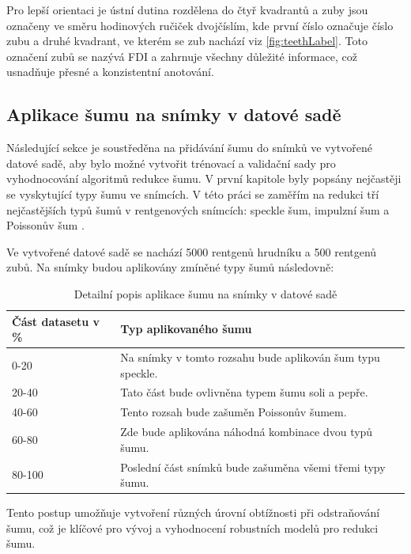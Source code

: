 \documentclass[male,czech,api_ing]{thesis}
\begin{document}
Pro lepší orientaci je ústní dutina rozdělena do čtyř kvadrantů a zuby jsou označeny ve směru hodinových ručiček dvojčíslím, kde první číslo označuje číslo zubu a druhé kvadrant, ve kterém se zub nachází viz \ref{fig:teethLabel}. Toto označení zubů se nazývá FDI \cite{FDI-teeth_labeling} a zahrnuje všechny důležité informace, což usnadňuje přesné a konzistentní anotování.

\subsection{Aplikace šumu na snímky v datové sadě}
Následující sekce je soustředěna na přidávání šumu do snímků ve vytvořené datové sadě, aby bylo možné vytvořit trénovací a validační sady pro vyhodnocování algoritmů redukce šumu. V první kapitole byly popsány nejčastěji se vyskytující typy šumu ve snímcích. V této práci se zaměřím na redukci tří nejčastějších typů šumů v rentgenových snímcích: speckle šum, impulzní šum a Poissonův šum \cite{MostCommonNoises}.

Ve vytvořené datové sadě se nachází 5000 rentgenů hrudníku a 500 rentgenů zubů. Na snímky budou aplikovány zmíněné typy šumů následovně:

\begin{table}[h]
    \centering
    \begin{tabular}{|l|l|}
        \hline
        \textbf{Část datasetu v \%} & \textbf{Typ aplikovaného šumu}                    \\ \hline
        0-20   & Na snímky v tomto rozsahu bude aplikován šum typu speckle.             \\ \hline
        20-40  & Tato část bude ovlivněna typem šumu soli a pepře.                      \\ \hline
        40-60  & Tento rozsah bude zašuměn Poissonův šumem.                             \\ \hline
        60-80  & Zde bude aplikována náhodná kombinace dvou typů šumu.                  \\ \hline
        80-100 & Poslední část snímků bude zašuměna všemi třemi typy šumu.              \\ 
        \hline
    \end{tabular}
    \caption{Detailní popis aplikace šumu na snímky v datové sadě}
    \label{table:noiseTypes}
\end{table}

Tento postup umožňuje vytvoření různých úrovní obtížnosti při odstraňování šumu, což je klíčové pro vývoj a vyhodnocení robustních modelů pro redukci šumu.
\end{document}
